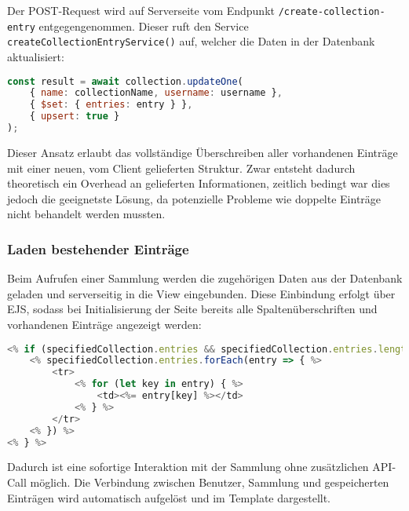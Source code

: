 Der POST-Request wird auf Serverseite vom Endpunkt \texttt{/create-collection-entry} entgegengenommen.
Dieser ruft den Service \texttt{createCollectionEntryService()} auf, welcher die Daten in der Datenbank aktualisiert:

\begin{lstlisting}[language=JavaScript, caption=Service-Logik zum Überschreiben von Einträgen]
const result = await collection.updateOne(
    { name: collectionName, username: username },
    { $set: { entries: entry } },
    { upsert: true }
);
\end{lstlisting}

Dieser Ansatz erlaubt das vollständige Überschreiben aller vorhandenen Einträge mit einer neuen, vom Client gelieferten Struktur.
Zwar entsteht dadurch theoretisch ein Overhead an gelieferten Informationen, zeitlich bedingt war dies jedoch die geeignetste Lösung, da potenzielle Probleme wie doppelte Einträge nicht behandelt werden mussten.

\subsubsection{Laden bestehender Einträge}

Beim Aufrufen einer Sammlung werden die zugehörigen Daten aus der Datenbank geladen und serverseitig in die View eingebunden.
Diese Einbindung erfolgt über EJS, sodass bei Initialisierung der Seite bereits alle Spaltenüberschriften und vorhandenen Einträge angezeigt werden:

\begin{lstlisting}[language=JavaScript, caption=Darstellung in collections.ejs]
<% if (specifiedCollection.entries && specifiedCollection.entries.length > 0) { %>
    <% specifiedCollection.entries.forEach(entry => { %>
        <tr>
            <% for (let key in entry) { %>
                <td><%= entry[key] %></td>
            <% } %>
        </tr>
    <% }) %>
<% } %>
\end{lstlisting}

Dadurch ist eine sofortige Interaktion mit der Sammlung ohne zusätzlichen API-Call möglich.
Die Verbindung zwischen Benutzer, Sammlung und gespeicherten Einträgen wird automatisch aufgelöst und im Template dargestellt.
